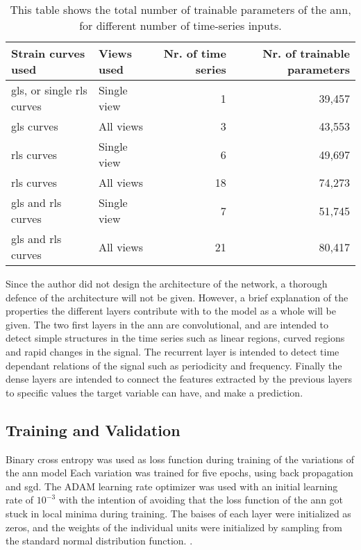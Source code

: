 \begin{table*}
    \centering
    \begin{tabular}{ llrr }
        \toprule
        Strain curves used                              & Views used  & Nr. of time series & Nr. of trainable parameters \\
        \midrule                                     
        \acrshort{gls}, or single \acrshort{rls} curves & Single view &         1          & 39,457 \\
        \acrshort{gls} curves                           &  All views  &         3          & 43,553 \\
        \acrshort{rls} curves                           & Single view &         6          & 49,697 \\
        \acrshort{rls} curves                           &  All views  &        18          & 74,273 \\
        \acrshort{gls} and \acrshort{rls} curves        & Single view &         7          & 51,745 \\
        \acrshort{gls} and \acrshort{rls} curves        &  All views  &        21          & 80,417 \\
        \bottomrule
    \end{tabular}
    \caption{This table shows the total number of trainable parameters of the \acrshort{ann}, for different number of time-series inputs.}
    \label{tab:train_params}
\end{table*}

Since the author did not design the architecture of the network, a thorough defence of the architecture will not be given. However, a brief explanation of the properties the different layers contribute with to the model as a whole will be given. The two first layers in the \acrshort{ann} are convolutional, and are intended to detect simple structures in the time series such as linear regions, curved regions and rapid changes in the signal. The recurrent layer is intended to detect time dependant relations of the signal such as periodicity and frequency. Finally the dense layers are intended to connect the features extracted by the previous layers to specific values the target variable can have, and make a prediction.

\subsection{Training and Validation}

Binary cross entropy was used as loss function during training of the variations of the \acrshort{ann} model Each variation was trained for five epochs, using back propagation and \acrshort{sgd}. The ADAM learning rate optimizer was used with an initial learning rate of $10^{-3}$ with the intention of avoiding that the loss function of the \acrshort{ann} got stuck in local minima during training. The baises of each layer were initialized as zeros, and the weights of the individual units were initialized by sampling from the standard normal distribution function. \bigskip. 

